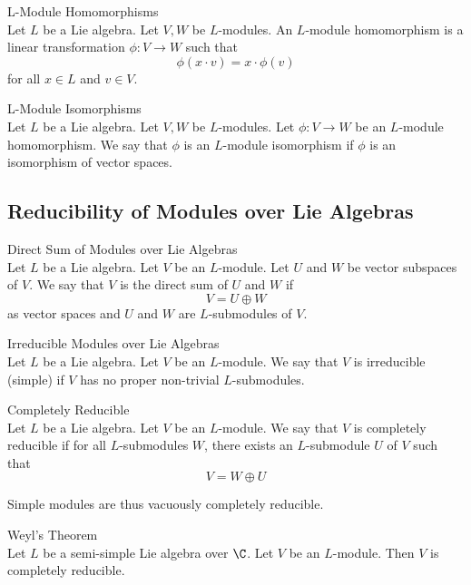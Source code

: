 \documentclass[a4paper]{article}
\begin{document}
\begin{defn}{L-Module Homomorphisms}{} \\Let $L$ be a Lie algebra. Let $V,W$ be $L$-modules. An $L$-module homomorphism is a linear transformation $\phi:V\to W$ such that $$\phi(x\cdot v)=x\cdot\phi(v)$$ for all $x\in L$ and $v\in V$. 
\end{defn}

\begin{defn}{L-Module Isomorphisms}{} \\Let $L$ be a Lie algebra. Let $V,W$ be $L$-modules. Let $\phi:V\to W$ be an $L$-module homomorphism. We say that $\phi$ is an $L$-module isomorphism if $\phi$ is an isomorphism of vector spaces. 
\end{defn}

\subsection{Reducibility of Modules over Lie Algebras}
\begin{defn}{Direct Sum of Modules over Lie Algebras}{} \\Let $L$ be a Lie algebra. Let $V$ be an $L$-module. Let $U$ and $W$ be vector subspaces of $V$. We say that $V$ is the direct sum of $U$ and $W$ if $$V=U\oplus W$$ as vector spaces and $U$ and $W$ are $L$-submodules of $V$. 
\end{defn}

\begin{defn}{Irreducible Modules over Lie Algebras}{} \\Let $L$ be a Lie algebra. Let $V$ be an $L$-module. We say that $V$ is irreducible (simple) if $V$ has no proper non-trivial $L$-submodules. 
\end{defn}

\begin{defn}{Completely Reducible}{} \\Let $L$ be a Lie algebra. Let $V$ be an $L$-module. We say that $V$ is completely reducible if for all $L$-submodules $W$, there exists an $L$-submodule $U$ of $V$ such that $$V=W\oplus U$$
\end{defn}

Simple modules are thus vacuously completely reducible. 

\begin{thm}{Weyl's Theorem}{} \\Let $L$ be a semi-simple Lie algebra over $\C$. Let $V$ be an $L$-module. Then $V$ is completely reducible. 
\end{thm}
\end{document}
